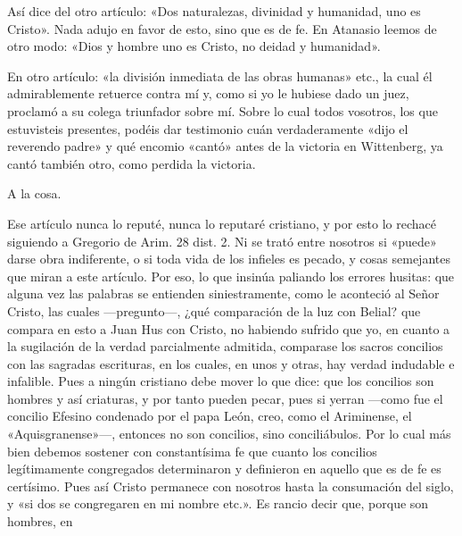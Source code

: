 Así dice del otro artículo: «Dos naturalezas, divinidad y humanidad, uno es Cristo». Nada adujo en favor de esto, sino que es de fe. En Atanasio leemos de otro modo: «Dios y hombre uno es Cristo, no deidad y humanidad».

En otro artículo: «la división inmediata de las obras humanas» etc., la cual él admirablemente retuerce contra mí y, como si yo le hubiese dado un juez, proclamó a su colega triunfador sobre mí. Sobre lo cual todos vosotros, los que estuvisteis presentes, podéis dar testimonio cuán verdaderamente «dijo el reverendo padre» y qué encomio «cantó» antes de la victoria en Wittenberg, ya cantó también otro, como perdida la victoria.

A la cosa.

Ese artículo nunca lo reputé, nunca lo reputaré cristiano, y por esto lo rechacé siguiendo a Gregorio de Arim. 28 dist. 2. Ni se trató entre nosotros si «puede» darse obra indiferente, o si toda vida de los infieles es pecado, y cosas semejantes que miran a este artículo. Por eso, lo que insinúa paliando los errores husitas: que alguna vez las palabras se entienden siniestramente, como le aconteció al Señor Cristo, las cuales —pregunto—, ¿qué comparación de la luz con Belial? que compara en esto a Juan Hus con Cristo, no habiendo sufrido que yo, en cuanto a la sugilación de la verdad parcialmente admitida, comparase los sacros \marginpar{\small[296]} concilios con las sagradas escrituras, en los cuales, en unos y otras, hay verdad indudable e infalible. Pues a ningún cristiano debe mover lo que dice: que los concilios son hombres y así criaturas, y por tanto pueden pecar, pues si yerran —como fue el concilio Efesino condenado por el papa León, creo, como el Ariminense, el «Aquisgranense»—, entonces no son concilios, sino conciliábulos. Por lo cual más bien debemos sostener con constantísima fe que cuanto los concilios legítimamente congregados determinaron y definieron en aquello que es de fe es certísimo. Pues así Cristo permanece con nosotros hasta la consumación del siglo, y «si dos se congregaren en mi nombre etc.». Es rancio decir que, porque son hombres, en

